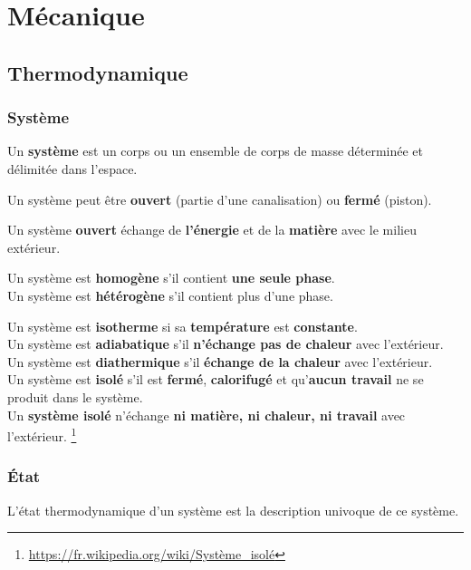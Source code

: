\documentclass[]{article}
\date{}
\begin{document}
\section{Mécanique}\label{muxe9canique}

\subsection{Thermodynamique}\label{thermodynamique}

\subsubsection{Système}\label{systuxe8me}

Un \textbf{système} est un corps ou un ensemble de corps de masse déterminée et délimitée dans l’espace.

Un système peut être \textbf{ouvert} (partie d’une canalisation) ou \textbf{fermé} (piston).

Un système \textbf{ouvert} échange de \textbf{l’énergie} et de la \textbf{matière} avec le milieu extérieur.

Un système est \textbf{homogène} s’il contient \textbf{une seule phase}. \\
Un système est \textbf{hétérogène} s’il contient plus d’une phase.

Un système est \textbf{isotherme} si sa \textbf{température} est \textbf{constante}. \\
Un système est \textbf{adiabatique} s’il \textbf{n’échange pas de chaleur} avec l’extérieur. \\
Un système est \textbf{diathermique} s’il \textbf{échange de la chaleur} avec
l’extérieur. \\

Un système est \textbf{isolé} s’il est \textbf{fermé}, \textbf{calorifugé} et
qu’\textbf{aucun travail} ne se produit dans le système. \\

Un \textbf{système isolé} n’échange \textbf{ni matière, ni chaleur, ni
travail} avec l’extérieur. \footnote{\url{https://fr.wikipedia.org/wiki/Système\_isolé}}


\subsubsection{État}\label{uxe9tat}

L’état thermodynamique d’un système est la description univoque de ce
système.
\end{document}
